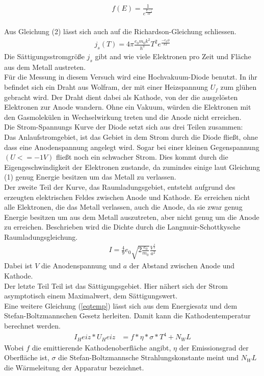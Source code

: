 \begin{align}
f(E)=\frac{1}{e^\frac{E-\zeta}{kT}}
\end{align}
\\
Aus Gleichung (2) lässt sich auch auf die Richardson-Gleichung schliessen.
\begin{align}
j_s(T)=4\pi\frac{e_0 m_0 k^2}{h^3}T^2e^\frac{-e_0\phi}{kT} \label{eqrichard}
\end{align}
Die Sättigungsstromgröße $j_s$ gibt and wie viele Elektronen pro Zeit und Fläche aus dem Metall austreten.
\\
Für die Messung in diesem Versuch wird eine Hochvakuum-Diode benutzt. In ihr befindet sich ein Draht aus Wolfram, der mit einer Heizspannung $U_f$ zum glühen gebracht wird. Der Draht dient dabei als Kathode, von der die ausgelösten Elektronen zur Anode wandern. Ohne ein Vakuum, würden die Elektronen mit den Gasmolekülen in Wechselwirkung treten und die Anode nicht erreichen.
\\
Die Strom-Spannungs Kurve der Diode setzt sich aus drei Teilen zusammen:
\\
Das Anlaufstromgebiet, ist das Gebiet in dem Strom durch die Diode fließt, ohne dass eine Anodenspannung angelegt wird. Sogar bei einer kleinen Gegenspannung $(U<=-1V)$ fließt noch ein schwacher Strom. Dies kommt durch die Eigengeschwindigkeit der Elektronen zustande, da zumindes einige laut Gleichung (1) genug Energie besitzen um das Metall zu verlassen.
\\
Der zweite Teil der Kurve, das Raumladungsgebiet, entsteht aufgrund des erzeugten elektrischen Feldes zwischen Anode und Kathode. Es erreichen nicht alle Elektronen, die das Metall verlassen, auch die Anode, da sie zwar genug Energie besitzen  um aus dem Metall auszutreten, aber nicht genug um die Anode zu erreichen.
Beschrieben wird die Dichte durch die Langmuir-Schottkysche Raumladungsgleichung.
\begin{align}
I=\frac49e_0\sqrt{2\frac{e_0}{m_0}}\frac{V^\frac32}{a^2} \label{eqlangmuir}
\end{align}
Dabei ist $V$ die Anodenspannung und $a$ der Abstand zwischen Anode und Kathode.
\\
Der letzte Teil Teil ist das Sättigungsgebiet. Hier nähert sich der Strom asymptotisch einem Maximalwert, dem Sättigungswert. \\

Eine weitere Gleichung (\ref{eqtemp}) lässt sich aus dem Energiesatz und dem Stefan-Boltzmannschen Gesetz \cite{anleitung}
herleiten. Damit kann die Kathodentemperatur berechnet werden.
\begin{align}
I_Heiz*U_Heiz&=f*\eta*\sigma*T^4+N_WL \label{eqtemp}
\end{align}
Wobei $f$ die emittierende Kathodenoberfläche angibt, $\eta$ der Emissionsgrad der Oberfläche ist, $\sigma$ 
die Stefan-Boltzmannsche Strahlungskonstante meint und $N_WL$ die Wärmeleitung der Apparatur bezeichnet.





